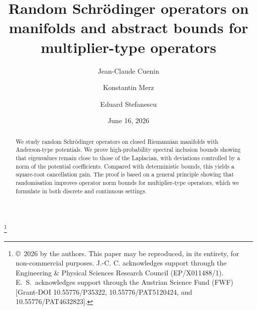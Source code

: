 \documentclass[12pt,reqno]{amsart}
\newcommand\version{June 16, 2026}
\theoremstyle{definition}
\theoremstyle{remark}
\numberwithin{equation}{section}
\newcommand{\1}{\mathbbm{1}}
\begin{document}
\title[Random Schr\"odinger operators on manifolds --- \version]{Random Schr\"odinger operators on manifolds and abstract bounds for multiplier-type operators}

\author[J.-C. Cuenin]{Jean-Claude Cuenin}
\address[Jean-Claude Cuenin]{Department of Mathematical Sciences, Loughborough University, Loughborough,
 Leicestershire, LE11 3TU United Kingdom}

\author[K. Merz]{Konstantin Merz}
\address[Konstantin Merz]{Institute for Theoretical Physics, ETH Zurich, Wolfgang-Pauli-Strasse 27, 8093 Zurich, Switzerland, and Institut f\"ur Analysis und Algebra, Technische Universit\"at Braunschweig, Universit\"atsplatz 2, 38106 Braun\-schweig, Germany}

\author[E. Stefanescu]{Eduard Stefanescu}
\address[Eduard Stefanescu]{Institut für Analysis und Zahlentheorie, TU Graz, Steyrergasse 30, 8010 Graz, Austria}

\thanks{\copyright\, 2026 by the authors. This paper may be reproduced, in its entirety, for non-commercial purposes. J.-C. C. acknowledges support through the Engineering \& Physical Sciences Research Council (EP/X011488/1). E.~S.~acknowledges support through the Austrian Science Fund (FWF) [Grant-DOI 10.55776/P35322, 10.55776/PAT5120424, and 10.55776/PAT4632823].}


\date{\version}

\begin{abstract}
We study random Schrödinger operators on closed Riemannian manifolds with Anderson-type potentials. We prove high-probability spectral inclusion bounds showing that eigenvalues remain close to those of the Laplacian, with deviations controlled by a norm of the potential coefficients. Compared with deterministic bounds, this yields a square-root cancellation gain. The proof is based on a general principle showing that randomisation improves operator norm bounds for multiplier-type operators, which we formulate in both discrete and continuous settings.
\end{abstract}

\maketitle
\end{document}
